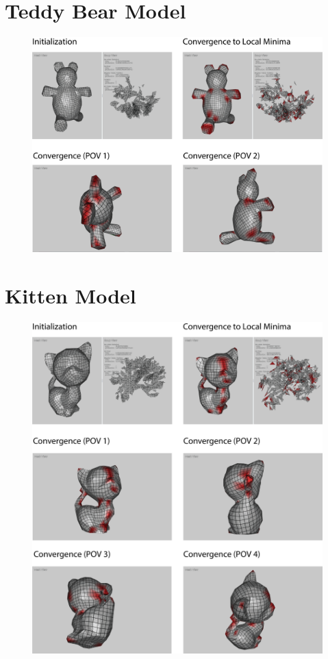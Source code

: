 \section{Teddy Bear Model}
\begin{figure}[ht]
\centering
\includegraphics[width=14cm]{figures/results/teddy.png}
\caption[Teddy Bear Model]{}
\end{figure}
\newpage
\section{Kitten Model}
\begin{figure}[ht]
\centering
\includegraphics[width=14cm]{figures/results/kitten.png}
\caption[Kitten Model]{}
\end{figure}
\newpage
